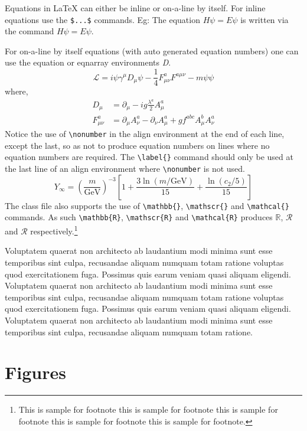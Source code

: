 \documentclass[autowc]{CUP-JNL-PPS}
\begin{document}
Equations in \LaTeX{} can either be inline or on-a-line by itself. For
inline equations use the \verb+$...$+ commands. Eg: The equation
$H\psi = E \psi$ is written via the command $H \psi = E \psi$.

For on-a-line by itself equations (with auto generated equation numbers)
one can use the equation or eqnarray environments \textit{D}.
\begin{equation}
\mathcal{L} = i {\psi} \gamma^\mu D_\mu \psi
    - \frac{1}{4} F_{\mu\nu}^a F^{a\mu\nu} - m {\psi} \psi
\label{eq1}
\end{equation}
where,
\begin{align}
D_\mu &=  \partial_\mu - ig \frac{\lambda^a}{2} A^a_\mu
\nonumber \\
F^a_{\mu\nu} &= \partial_\mu A^a_\nu - \partial_\nu A^a_\mu
    + g f^{abc} A^b_\mu A^a_\nu
\label{eq2}
\end{align}
Notice the use of \verb+\nonumber+ in the align environment at the end
of each line, except the last, so as not to produce equation numbers on
lines where no equation numbers are required. The \verb+\label{}+ command
should only be used at the last line of an align environment where
\verb+\nonumber+ is not used.
\begin{equation}
Y_\infty = \left( \frac{m}{\textrm{GeV}} \right)^{-3}
    \left[ 1 + \frac{3 \ln(m/\textrm{GeV})}{15}
    + \frac{\ln(c_2/5)}{15} \right]
\end{equation}
The class file also supports the use of \verb+\mathbb{}+, \verb+\mathscr{}+ and
\verb+\mathcal{}+ commands. As such \verb+\mathbb{R}+, \verb+\mathscr{R}+
and \verb+\mathcal{R}+ produces $\mathbb{R}$, $\mathscr{R}$ and $\mathcal{R}$
respectively.\footnote{This is sample for footnote this is sample for footnote this is sample for footnote  this is sample for footnote this is sample for footnote.}

Voluptatem quaerat non architecto ab laudantium
modi minima sunt esse temporibus sint culpa, recusandae aliquam numquam
totam ratione voluptas quod exercitationem fuga. Possimus quis earum veniam
quasi aliquam eligendi.
Voluptatem quaerat non architecto ab laudantium
modi minima sunt esse temporibus sint culpa, recusandae aliquam numquam
totam ratione voluptas quod exercitationem fuga. Possimus quis earum veniam
quasi aliquam eligendi.
Voluptatem quaerat non architecto ab laudantium
modi minima sunt esse temporibus sint culpa, recusandae aliquam numquam
totam ratione.

\section{Figures}
\end{document}
